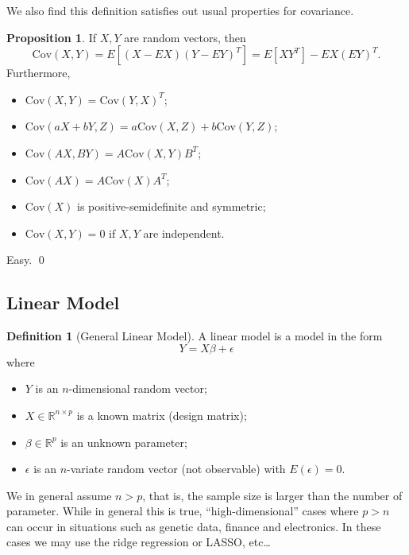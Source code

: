 \documentclass[
]{article}
\theoremstyle{definition}
\newtheorem{prop}{Proposition}
\theoremstyle{definition}
\newtheorem{definition}{Definition}[section]
\begin{document}
We also find this definition satisfies out usual properties for
covariance.

\begin{prop}
  If \(X, Y\) are random vectors, then 
  \[\text{Cov}(X, Y) = E[(X - EX)(Y - EY)^T] = E[XY^T] - EX (EY)^T.\]
  Furthermore, 
  \begin{itemize}
    \item \(\text{Cov}(X, Y) = \text{Cov}(Y, X)^T\);
    \item \(\text{Cov}(aX + bY, Z) = a\text{Cov}(X, Z) + b\text{Cov}(Y, Z)\);
    \item \(\text{Cov}(AX, BY) = A\text{Cov}(X, Y)B^T\);
    \item \(\text{Cov}(AX) = A\text{Cov}(X)A^T\);
    \item \(\text{Cov}(X)\) is positive-semidefinite and symmetric;
    \item \(\text{Cov}(X, Y) = 0\) if \(X, Y\) are independent.
  \end{itemize}
\end{prop}
\proof

Easy. \qed

\hypertarget{linear-model}{%
\subsection{Linear Model}\label{linear-model}}

\begin{definition}[General Linear Model]
  A linear model is a model in the form 
  \[Y = X \beta + \epsilon\]
  where 
  \begin{itemize}
    \item \(Y\) is an \(n\)-dimensional random vector;
    \item \(X \in \mathbb{R}^{n \times p}\) is a known matrix (design matrix);
    \item \(\beta \in \mathbb{R}^p\) is an unknown parameter;
    \item \(\epsilon\) is an \(n\)-variate random vector (not observable) with 
      \(E(\epsilon) = 0\).
  \end{itemize}
\end{definition}

We in general assume \(n > p\), that is, the sample size is larger than
the number of parameter. While in general this is true,
``high-dimensional'' cases where \(p > n\) can occur in situations such
as genetic data, finance and electronics. In these cases we may use the
ridge regression or LASSO, etc\ldots{}
\end{document}
